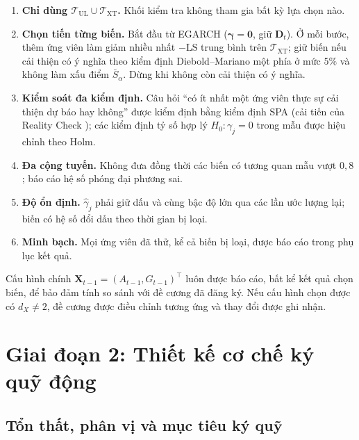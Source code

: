 \documentclass[12pt,a4paper]{article}
\theoremstyle{definition}
\theoremstyle{remark}
\newcommand{\LS}{\mathrm{LS}}
\newcommand{\bgamma}{\boldsymbol{\gamma}}
\newcommand{\bX}{\mathbf{X}}
\newcommand{\bD}{\mathbf{D}}
\begin{document}
\begin{enumerate}
\item \textbf{Chỉ dùng $\mathcal T_{\mathrm{UL}}\cup\mathcal T_{\mathrm{XT}}$.} Khối kiểm tra không tham gia bất kỳ lựa chọn nào.
\item \textbf{Chọn tiến từng biến.} Bắt đầu từ EGARCH ($\bgamma=\mathbf 0$, giữ $\bD_t$). Ở mỗi bước, thêm ứng viên làm giảm nhiều nhất $-\LS$ trung bình trên $\mathcal T_{\mathrm{XT}}$; giữ biến nếu cải thiện có ý nghĩa theo kiểm định Diebold--Mariano một phía ở mức $5\%$ và không làm xấu điểm $\bar S_\alpha$. Dừng khi không còn cải thiện có ý nghĩa.
\item \textbf{Kiểm soát đa kiểm định.} Câu hỏi ``có ít nhất một ứng viên thực sự cải thiện dự báo hay không'' được kiểm định bằng kiểm định SPA \cite{hansen2005} (cải tiến của Reality Check \cite{white2000}); các kiểm định tỷ số hợp lý $H_0:\gamma_j=0$ trong mẫu được hiệu chỉnh theo Holm.
\item \textbf{Đa cộng tuyến.} Không đưa đồng thời các biến có tương quan mẫu vượt $0{,}8$; báo cáo hệ số phóng đại phương sai.
\item \textbf{Độ ổn định.} $\hat\gamma_j$ phải giữ dấu và cùng bậc độ lớn qua các lần ước lượng lại; biến có hệ số đổi dấu theo thời gian bị loại.
\item \textbf{Minh bạch.} Mọi ứng viên đã thử, kể cả biến bị loại, được báo cáo trong phụ lục kết quả.
\end{enumerate}

Cấu hình chính $\bX_{t-1}=(A_{t-1},G_{t-1})^\top$ luôn được báo cáo, bất kể kết quả chọn biến, để bảo đảm tính so sánh với đề cương đã đăng ký. Nếu cấu hình chọn được có $d_X\ne2$, đề cương được điều chỉnh tương ứng và thay đổi được ghi nhận.

\section{Giai đoạn 2: Thiết kế cơ chế ký quỹ động}\label{sec:kyquy}

\subsection{Tổn thất, phân vị và mục tiêu ký quỹ}
\end{document}
